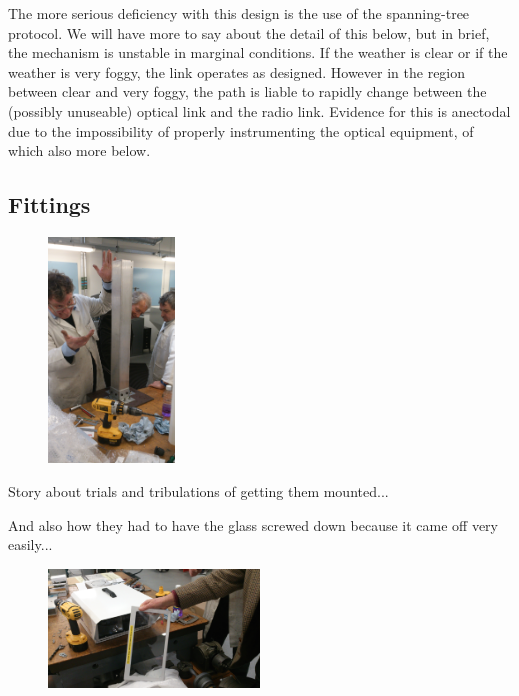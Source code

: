 The more serious deficiency with this design is the use of the
spanning-tree protocol. We will have more to say about the detail of
this below, but in brief, the mechanism is unstable in marginal
conditions. If the weather is clear or if the weather is very foggy,
the link operates as designed. However in the region between clear and
very foggy, the path is liable to rapidly change between the (possibly
unuseable) optical link and the radio link. Evidence for this is
anectodal due to the impossibility of properly instrumenting the
optical equipment, of which also more below.
\clearpage
\subsection{Fittings}
\label{sec:fittings}

\begin{figure}
  \includegraphics[angle=-90,width=0.3\textwidth]{tada}
\end{figure}
Story about trials and tribulations of getting them mounted...

And also how they had to have the glass screwed down because it came
off very easily...

\begin{figure}[h]
  \begin{center}
    \includegraphics[width=0.5\textwidth]{faulty}
  \end{center}
\end{figure}

